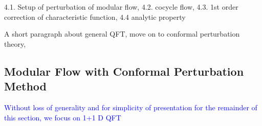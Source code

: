 \documentclass[a4paper,11pt]{article}
\theoremstyle{definition}
\theoremstyle{remark}
\newcommand{\NL}[1]{\textcolor{blue}{#1}}
\begin{document}

4.1. Setup of perturbation of modular flow, 4.2. cocycle flow, 4.3. 1st order correction of characteristic function, 4.4 analytic property 

A short paragraph about general QFT, move on to conformal perturbation theory, %
\subsection{Modular Flow with Conformal Perturbation Method}

\NL{Without loss of generality and for simplicity of presentation for the remainder of this section, we focus on 1+1 D QFT}
\end{document}
